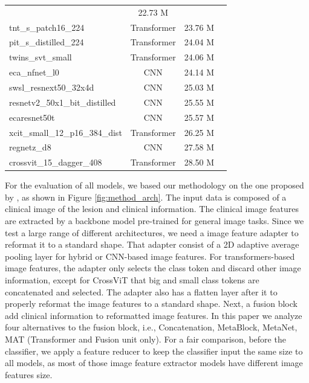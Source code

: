 \documentclass[conference]{IEEEtran}
\begin{document}
\begin{table}[htbp]
\begin{tabular}{l|c|c|c}
& {22.73 M} & \cite{vaswani2021scaling, he2016deep}                    \\
tnt\_s\_patch16\_224                & Transformer
& {23.76 M} & \cite{han2021transformer}                    \\
pit\_s\_distilled\_224              & Transformer
& {24.04 M} & \cite{heo2021rethinking}                    \\
twins\_svt\_small                   & Transformer
& {24.06 M} & \cite{chu2021twins}                    \\
eca\_nfnet\_l0                      & CNN
& {24.14 M} & \cite{brock2021high, wang2020eca}                    \\
swsl\_resnext50\_32x4d              & CNN
& {25.03 M} & \cite{xie2017aggregated, yalniz2019billion}                    \\
resnetv2\_50x1\_bit\_distilled      & CNN
& {25.55 M} & \cite{he2016identity, beyer2021knowledge, kolesnikov2020big}                    \\
ecaresnet50t                        & CNN
& {25.57 M} & \cite{he2016deep}                    \\
xcit\_small\_12\_p16\_384\_dist     & Transformer
& {26.25 M} & \cite{el2021xcit}                    \\
regnetz\_d8                         & CNN
& {27.58 M} & \cite{dollar2021fast}                    \\
crossvit\_15\_dagger\_408           & Transformer
& {28.50 M} & \cite{chen2021crossvit}                    \\
\bottomrule
\end{tabular}
\label{table:top20_param}
\end{table}


For the evaluation of all models, we based our methodology on the one proposed by \cite{pacheco2020impact}, as shown in Figure \ref{fig:method_arch}. The input data is composed of a clinical image of the lesion and clinical information. The clinical image features are extracted by a backbone model pre-trained for general image tasks. Since we test a large range of different architectures, we need a image feature adapter to reformat it to a standard shape. That adapter consist of a 2D adaptive average pooling layer for hybrid or CNN-based image features. For transformers-based image features, the adapter only selects the class token and discard other image information, except for CrossViT that big and small class tokens are concatenated and selected. The adapter also has a flatten layer after it to properly reformat the image features to a standard shape. Next, a fusion block add clinical information to reformatted image features. In this paper we analyze four alternatives to the fusion block, i.e., Concatenation, MetaBlock, MetaNet, MAT (Transformer and Fusion unit only). For a fair comparison, before the classifier, we apply a feature reducer to keep the classifier input the same size to all models, as most of those image feature extractor models have different image features size.
\end{document}
